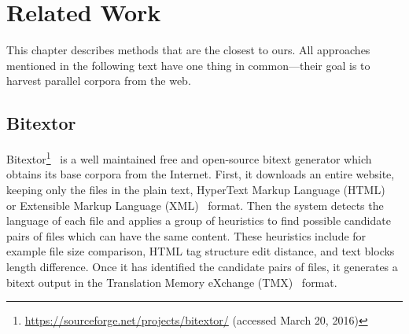
\chapter{Related Work}
\label{chapter:related_work}

This chapter describes methods that are the closest to ours. All approaches mentioned in the following text have one thing in common---their goal is to harvest parallel corpora from the web.

\section{Bitextor}
\label{section:bitextor}

Bitextor\footnote{\url{https://sourceforge.net/projects/bitextor/} (accessed March 20, 2016)}~\cite{EsplaGomis09}\cite{EsplaGomis10} is a well maintained free and open-source bitext generator which obtains its base corpora from the Internet. First, it downloads an entire website, keeping only the files in the plain text, HyperText Markup Language (HTML)~\cite{HTML} or Extensible Markup Language (XML)~\cite{XML} format. Then the system detects the language of each file and applies a group of heuristics to find possible candidate pairs of files which can have the same content. These heuristics include for example file size comparison, HTML tag structure edit distance, and text blocks length difference. Once it has identified the candidate pairs of files, it generates a bitext output in the Translation Memory eXchange (TMX)~\cite{TMX} format. 

